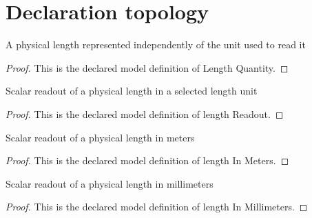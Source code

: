 \section{Declaration topology}
\begin{definition}
  \label{def:physics:phyx-mini-0075:phyxminiproblems-problemphyxmini0075-lengthquantity}
  A physical length represented independently of the unit used to read it
\end{definition}
\begin{proof}
  This is the declared model definition of Length Quantity.
\end{proof}
\begin{definition}
  \label{def:physics:phyx-mini-0075:phyxminiproblems-problemphyxmini0075-lengthreadout}
  Scalar readout of a physical length in a selected length unit
\end{definition}
\begin{proof}
  This is the declared model definition of length Readout.
\end{proof}
\begin{definition}
  \label{def:physics:phyx-mini-0075:phyxminiproblems-problemphyxmini0075-lengthinmeters}
  Scalar readout of a physical length in meters
\end{definition}
\begin{proof}
  This is the declared model definition of length In Meters.
\end{proof}
\begin{definition}
  \label{def:physics:phyx-mini-0075:phyxminiproblems-problemphyxmini0075-lengthinmillimeters}
  Scalar readout of a physical length in millimeters
\end{definition}
\begin{proof}
  This is the declared model definition of length In Millimeters.
\end{proof}
